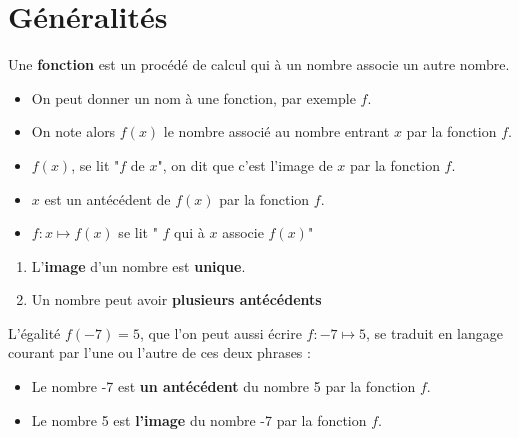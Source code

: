 \section{Généralités}
\begin{definition}
    Une \textbf{fonction} est un procédé de calcul qui à un nombre associe un autre nombre.

    \smallskip
    \begin{center}
    \end{center}
\end{definition}

\begin{vocabulaireNotations}        
        \begin{itemize}
            \item On peut donner un nom à une fonction, par exemple $f$.
            \item On note alors $f(x)$ le nombre associé au nombre entrant $x$ par la fonction $f$.
            \item $f(x)$, se lit "$f$ de $x$", on dit que c'est l'image de $x$ par la fonction $f$.
            \item $x$ est un antécédent de $f(x)$ par la fonction $f$.
            \item  $f : x\longmapsto f(x)$ se lit " $f$ qui à $x$ associe $f(x)$"
        \end{itemize}
\end{vocabulaireNotations}

\begin{remarques}
    \begin{enumerate}
        \item L'\textbf{image} d'un nombre est \textbf{unique}.
        \item Un nombre peut avoir \textbf{plusieurs antécédents}
    \end{enumerate}
\end{remarques}

\begin{exemple*1}
    L'égalité $f(-7)=5$, que l'on peut aussi écrire $f : -7\longmapsto 5$, se traduit en langage courant par l'une ou l'autre de ces deux phrases :
    \begin{itemize}
        \item Le nombre -7 est \textbf{un antécédent} du nombre 5 par la fonction $f$.
        \item Le nombre 5 est \textbf{l'image} du nombre -7 par la fonction $f$.
    \end{itemize}
\end{exemple*1}

